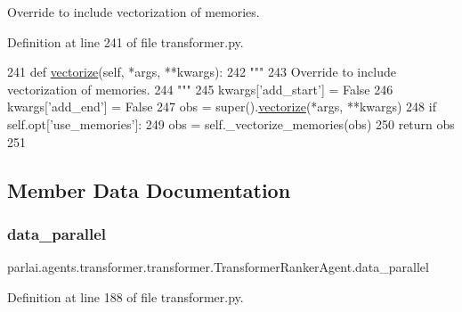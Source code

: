 \begin{DoxyVerb}Override to include vectorization of memories.
\end{DoxyVerb}
 

Definition at line 241 of file transformer.\+py.


\begin{DoxyCode}
241     \textcolor{keyword}{def }\hyperlink{namespaceparlai_1_1agents_1_1drqa_1_1utils_a5c76cc39e3014c7bcf9199d566dbdc0f}{vectorize}(self, *args, **kwargs):
242         \textcolor{stringliteral}{"""}
243 \textcolor{stringliteral}{        Override to include vectorization of memories.}
244 \textcolor{stringliteral}{        """}
245         kwargs[\textcolor{stringliteral}{'add\_start'}] = \textcolor{keyword}{False}
246         kwargs[\textcolor{stringliteral}{'add\_end'}] = \textcolor{keyword}{False}
247         obs = super().\hyperlink{namespaceparlai_1_1agents_1_1drqa_1_1utils_a5c76cc39e3014c7bcf9199d566dbdc0f}{vectorize}(*args, **kwargs)
248         \textcolor{keywordflow}{if} self.opt[\textcolor{stringliteral}{'use\_memories'}]:
249             obs = self.\_vectorize\_memories(obs)
250         \textcolor{keywordflow}{return} obs
251 
\end{DoxyCode}


\subsection{Member Data Documentation}
\mbox{\label{classparlai_1_1agents_1_1transformer_1_1transformer_1_1TransformerRankerAgent_a1698ffc6dff7a16e6ea4835b1463266c}} 
\subsubsection{\texorpdfstring{data\+\_\+parallel}{data\_parallel}}
{\footnotesize\ttfamily parlai.\+agents.\+transformer.\+transformer.\+Transformer\+Ranker\+Agent.\+data\+\_\+parallel}



Definition at line 188 of file transformer.\+py.

